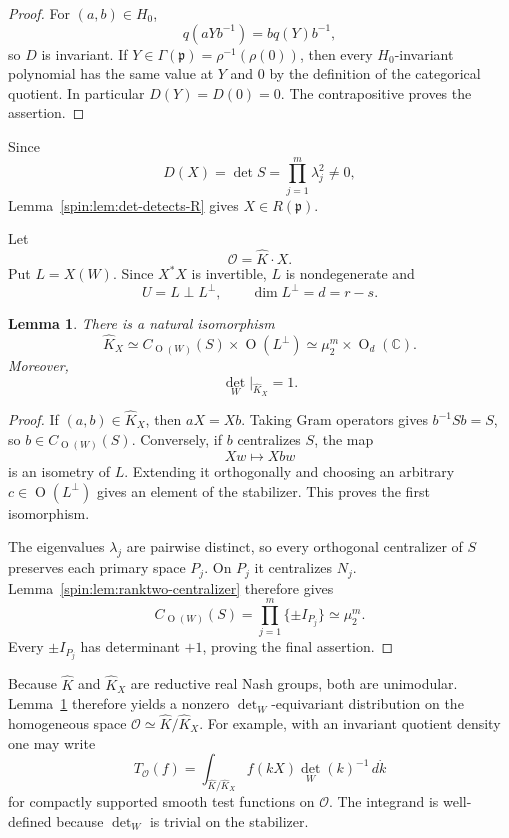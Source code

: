 \documentclass[10pt,a4paper]{amsart}
\numberwithin{equation}{section}
\newtheorem{lemma}[theorem]{Lemma}
\newcommand{\C}{\mathbb C}
\newcommand{\Or}{\operatorname{O}}
\newcommand{\fp}{\mathfrak p}
\newcommand{\cO}{\mathcal O}
\begin{document}
\begin{proof}
For $(a,b)\in H_0$,
\[
  q(aYb^{-1})=bq(Y)b^{-1},
\]
so $D$ is invariant.  If $Y\in\Gamma(\fp)=\rho^{-1}(\rho(0))$, then every
$H_0$-invariant polynomial has the same value at $Y$ and $0$ by the
definition of the categorical quotient.  In particular $D(Y)=D(0)=0$.
The contrapositive proves the assertion.
\end{proof}

Since
\[
  D(X)=\det S=\prod_{j=1}^m\lambda_j^2\ne0,
\]
Lemma~\ref{spin:lem:det-detects-R} gives $X\in R(\fp)$.

Let
\[
  \cO=\widehat K\cdot X.
\]
Put $L=X(W)$.  Since $X^*X$ is invertible, $L$ is nondegenerate and
\[
  U=L\perp L^\perp,
  \qquad
  \dim L^\perp=d=r-s.
\]

\begin{lemma}\label{spin:lem:start-stabilizer}
There is a natural isomorphism
\[
  \widehat K_X
  \simeq
  C_{\Or(W)}(S)\times\Or(L^\perp)
  \simeq
  \mu_2^m\times\Or_d(\C).
\]
Moreover,
\[
  \det_W|_{\widehat K_X}=1.
\]
\end{lemma}

\begin{proof}
If $(a,b)\in\widehat K_X$, then $aX=Xb$.  Taking Gram operators gives
$b^{-1}Sb=S$, so $b\in C_{\Or(W)}(S)$.  Conversely, if $b$ centralizes $S$,
the map
\[
  Xw\longmapsto Xbw
\]
is an isometry of $L$.  Extending it orthogonally and choosing an arbitrary
$c\in\Or(L^\perp)$ gives an element of the stabilizer.  This proves the first
isomorphism.

The eigenvalues $\lambda_j$ are pairwise distinct, so every orthogonal
centralizer of $S$ preserves each primary space $P_j$.  On $P_j$ it centralizes
$N_j$.  Lemma~\ref{spin:lem:ranktwo-centralizer} therefore gives
\[
  C_{\Or(W)}(S)
  =\prod_{j=1}^m\{\pm I_{P_j}\}
  \simeq\mu_2^m.
\]
Every $\pm I_{P_j}$ has determinant $+1$, proving the final assertion.
\end{proof}

Because $\widehat K$ and $\widehat K_X$ are reductive real Nash groups, both
are unimodular.  Lemma~\ref{spin:lem:start-stabilizer} therefore yields a nonzero
$\det_W$-equivariant distribution on the homogeneous space
$\cO\simeq\widehat K/\widehat K_X$.  For example, with an invariant quotient
density one may write
\begin{equation}\label{spin:eq:orbital-integral}
  T_{\cO}(f)
  =\int_{\widehat K/\widehat K_X}
       f(kX)\det_W(k)^{-1}\,d\dot k
\end{equation}
for compactly supported smooth test functions on $\cO$.  The integrand is
well-defined because $\det_W$ is trivial on the stabilizer.
\end{document}
